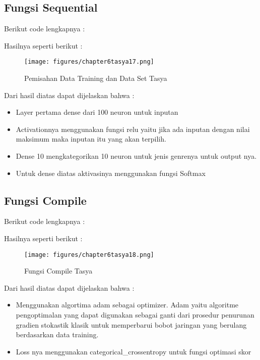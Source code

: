 \subsection{Fungsi Sequential}
Berikut code lengkapnya :

Hasilnya seperti berikut :
\begin{figure}[ht]
\centering
\texttt{[image: figures/chapter6tasya17.png]}
\caption{Pemisahan Data Training dan Data Set Tasya}
\label{Praktek}
\end{figure}
Dari hasil diatas dapat dijelaskan bahwa :
\begin{itemize}
\item Layer pertama dense dari 100 neuron untuk inputan
\item Activationnya menggunakan fungsi relu yaitu jika ada inputan dengan nilai maksimum maka inputan itu yang akan terpilih.
\item Dense 10 mengkategorikan 10 neuron untuk jenis genrenya untuk output nya.
\item Untuk dense diatas aktivasinya menggunakan fungsi Softmax
\end{itemize}

\subsection{Fungsi Compile}
 Berikut code lengkapnya : 

Hasilnya seperti berikut : 
\begin{figure}[ht]
\centering
\texttt{[image: figures/chapter6tasya18.png]}
\caption{Fungsi Compile Tasya}
\label{Praktek}
\end{figure}
Dari hasil diatas dapat dijelaskan bahwa :
\begin{itemize}
\item Menggunakan algortima adam sebagai optimizer. Adam yaitu algoritme pengoptimalan yang dapat digunakan sebagai ganti dari prosedur penurunan gradien stokastik klasik untuk memperbarui bobot jaringan yang berulang berdasarkan data training.
\item Loss nya menggunakan categorical\_crossentropy untuk fungsi optimasi skor
\end{itemize}


